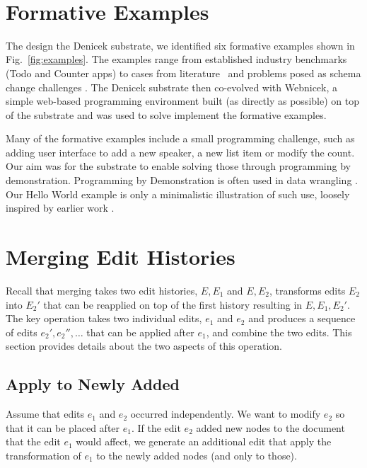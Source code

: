 \documentclass[sigconf,anonymous,screen]{acmart}
\begin{document}




\newpage
~
\newpage



\appendix
\section{Formative Examples}
\label{app:examples}

The design the Denicek substrate, we identified six formative examples shown in
Fig.~\ref{fig:examples}. The examples range from established industry benchmarks
(Todo and Counter apps) to cases from literature~\cite{edwards-2022-copypaste} and
problems posed as schema change challenges \cite{edwards-2025-schema}.
The Denicek substrate then co-evolved with Webnicek, a simple web-based programming environment
built (as directly as possible) on top of the substrate and was used to solve implement the
formative examples.

Many of the formative examples include a small programming challenge, such as adding
user interface to add a new speaker, a new list item or modify the count. Our aim was for
the substrate to enable solving  those through programming by demonstration.
Programming by Demonstration is often used in data wrangling
\cite{gulwani-2012-spreadsheet,drossos-2020-wrex,gulwani-2014-flash}. Our Hello World example
is only a minimalistic illustration of such use, loosely inspired by earlier work \cite{miller-2001-simult}.

\section{Merging Edit Histories}
Recall that merging takes two edit histories, $E, E_1$ and $E, E_2$,
transforms edits $E_2$ into $E_2'$ that can be reapplied on top of the first history
resulting in $E, E_1, E_2'$. The key operation takes two individual edits, $e_1$ and $e_2$
and produces a sequence of edits $e_2', e_2'', \ldots$ that can be applied after $e_1$,
and combine the two edits. This section provides details about the two aspects of this operation.

\subsection{Apply to Newly Added}
\label{app:merge-apply-to-added}

Assume that edits $e_1$ and $e_2$ occurred independently. We want to modify $e_2$ so that
it can be placed after $e_1$. If the edit $e_2$ added new nodes to the document that the
edit $e_1$ would affect, we generate an additional edit that apply the transformation of $e_1$
to the newly added nodes (and only to those).
\end{document}

